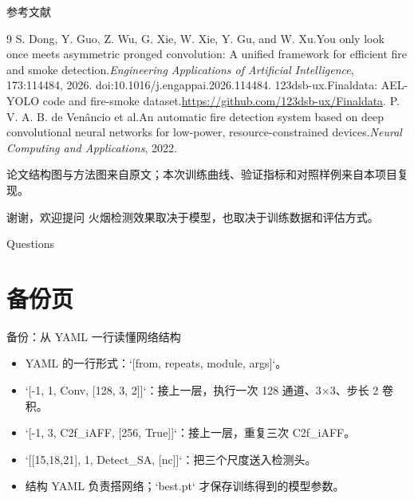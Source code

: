 \documentclass[aspectratio=169,10pt]{ctexbeamer}
\begin{document}
\begin{frame}{参考文献}
\small
\begin{thebibliography}{9}
 S. Dong, Y. Guo, Z. Wu, G. Xie, W. Xie, Y. Gu, and W. Xu.\newblock You only look once meets asymmetric pronged convolution: A unified framework for efficient fire and smoke detection.\newblock \emph{Engineering Applications of Artificial Intelligence}, 173:114484, 2026. doi:10.1016/j.engappai.2026.114484.
 123dsb-ux.\newblock Finaldata: AEL-YOLO code and fire-smoke dataset.\newblock \url{https://github.com/123dsb-ux/Finaldata}.
 P. V. A. B. de Ven\^ancio et al.\newblock An automatic fire detection system based on deep convolutional neural networks for low-power, resource-constrained devices.\newblock \emph{Neural Computing and Applications}, 2022.
\end{thebibliography}
\vfill\small 论文结构图与方法图来自原文；本次训练曲线、验证指标和对照样例来自本项目复现。
\end{frame}

\begin{frame}{谢谢，欢迎提问}
\centering
\vspace{1cm}
{\Large 火烟检测效果取决于模型，也取决于训练数据和评估方式。}
\vspace{.7cm}

\large Questions
\end{frame}

\appendix
\section{备份页}
\begin{frame}{备份：从 YAML 一行读懂网络结构}
\begin{itemize}
\item YAML 的一行形式：`[from, repeats, module, args]`。
\item `[-1, 1, Conv, [128, 3, 2]]`：接上一层，执行一次 128 通道、3×3、步长 2 卷积。
\item `[-1, 3, C2f\_iAFF, [256, True]]`：接上一层，重复三次 C2f\_iAFF。
\item `[[15,18,21], 1, Detect\_SA, [nc]]`：把三个尺度送入检测头。
\item 结构 YAML 负责搭网络；`best.pt` 才保存训练得到的模型参数。
\end{itemize}
\end{frame}
\end{document}
